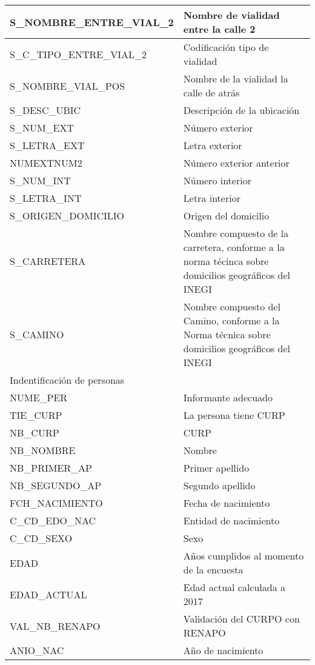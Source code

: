 \begin{longtable}{|p{8cm}|p{8cm}|}
    \hline
    S\_NOMBRE\_ENTRE\_VIAL\_2 & Nombre de vialidad entre la calle 2 \\
    \hline
    S\_C\_TIPO\_ENTRE\_VIAL\_2 & Codificación tipo de vialidad \\
    \hline
    S\_NOMBRE\_VIAL\_POS & Nombre de la vialidad la calle de atrás \\
    \hline
    S\_DESC\_UBIC & Descripción de la ubicación \\
    \hline
    S\_NUM\_EXT & Número exterior \\
    \hline
    S\_LETRA\_EXT & Letra exterior \\
    \hline
    NUMEXTNUM2 & Número exterior anterior \\
    \hline
    S\_NUM\_INT & Número interior \\
    \hline
    S\_LETRA\_INT & Letra interior \\
    \hline
    S\_ORIGEN\_DOMICILIO & Origen del domicilio \\
    \hline
    S\_CARRETERA & Nombre compuesto de la carretera, conforme a la norma técinca sobre domicilios geográficos del INEGI \\
    \hline
    S\_CAMINO & Nombre compuesto del Camino, conforme a la Norma técnica sobre domicilios geográficos del INEGI \\
    \hline
    \hline
    \multicolumn{2}{l}{Indentificación de personas}\\
    \hline
    NUME\_PER & Informante adecuado \\
    \hline
    TIE\_CURP & La persona tiene CURP \\
    \hline
    NB\_CURP & CURP \\
    \hline
    NB\_NOMBRE &  Nombre \\
    \hline
    NB\_PRIMER\_AP & Primer apellido \\
    \hline
    NB\_SEGUNDO\_AP & Segundo apellido \\
    \hline
    FCH\_NACIMIENTO & Fecha de nacimiento \\
    \hline
    C\_CD\_EDO\_NAC & Entidad de nacimiento \\
    \hline
    C\_CD\_SEXO & Sexo \\
    \hline
    EDAD & Años cumplidos al momento de la encuesta \\
    \hline
    EDAD\_ACTUAL & Edad actual calculada a 2017 \\
    \hline
    VAL\_NB\_RENAPO & Validación del CURPO con RENAPO \\
    \hline
    ANIO\_NAC & Año de nacimiento \\

\end{longtable}
